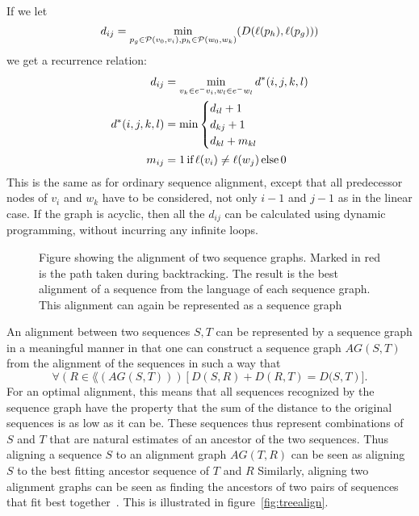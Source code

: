 If we let 
\[
  d_{ij} = \min_{p_g \in \paths(v_0, v_i), p_h \in \paths(w_0, w_k)}(D(\slabel(p_h), \slabel(p_g)))
\]  we get a recurrence relation:
\begin{align*}
  d_{ij} &= \min_{v_k \in \preds{v_i}, w_l \in \preds{w_l}} d^*(i, j, k, l)\\
  d^*(i, j, k, l) &= \min \begin{cases}
    d_{il} + 1\\
    d_{kj} + 1\\
    d_{kl} + m_{kl}\\
    \end{cases}    
    \\
    m_{ij} &= 1\, \text{if}\, \slabel(v_i) \neq \slabel(w_j)\, \text{else}\, 0\\
\end{align*}
This is the same as for ordinary sequence alignment, except that all predecessor nodes of $v_i$ and $w_k$ have to be considered, not only $i-1$ and $j-1$ as in the linear case.
If the graph is acyclic, then all the $d_{ij}$ can be calculated using dynamic programming, without incurring any infinite loops.
\begin{figure}
  \begin{tikzpicture}
    
  \end{tikzpicture}
  \caption{
    Figure showing the alignment of two sequence graphs.
    Marked in red is the path taken during backtracking.
    The result is the best alignment of a sequence from the language of each sequence graph.
    This alignment can again be represented as a sequence graph}
    \label{fig:seqgrapha}
\end{figure}

An alignment between two sequences $S, T$ can be represented by a sequence graph in a meaningful manner in that one can construct a sequence graph $AG(S, T)$ from the alignment of the sequences in such a way that 
\[
\forall (R \in \lang(AG(S, T)))\left[D(S, R)+D(R, T) =  D(S, T\right)].
\]
For an optimal alignment, this means that all sequences recognized by the sequence graph have the property that the sum of the distance to the original sequences is as low as it can be.
These sequences thus represent combinations of $S$ and $T$ that are natural estimates of an ancestor of the two sequences.
Thus aligning a sequence $S$ to an alignment graph $AG(T, R)$  can be seen as aligning $S$ to the best fitting ancestor sequence of $T$ and $R$
Similarly, aligning two alignment graphs can be seen as finding the ancestors of two pairs of sequences that fit best together~\cite{treealign}.
This is illustrated in figure~\ref{fig:treealign}.

